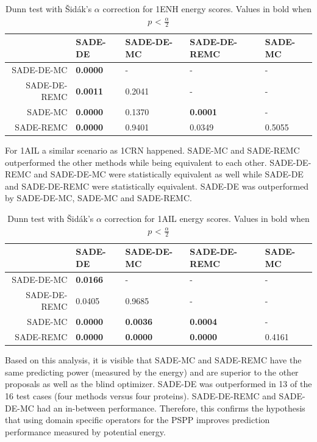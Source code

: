 \begin{table}[ht!]
  \centering
  \begin{tabular}{ r | l | l | l | l } \cline{2-5}
                 & SADE-DE         & SADE-DE-MC & SADE-DE-REMC    & SADE-MC \\ \hline \hline
   SADE-DE-MC    & \textbf{0.0000} & -          & -               & -       \\ \hline
 SADE-DE-REMC    & \textbf{0.0011} & 0.2041     & -               & -       \\ \hline
      SADE-MC    & \textbf{0.0000} & 0.1370     & \textbf{0.0001} & -       \\ \hline
    SADE-REMC    & \textbf{0.0000} & 0.9401     & 0.0349          & 0.5055  \\ \hline \hline
  \end{tabular}
  \caption{Dunn test with \v{S}idák's $\alpha$ correction for 1ENH energy scores. Values in bold when $p$ < $\frac{\alpha}{2}$}
  \label{tab:1enh-dunn-energy}
\end{table}

For 1AIL a similar scenario as 1CRN happened. SADE-MC and SADE-REMC outperformed the other methods
while being equivalent to each other. SADE-DE-REMC and SADE-DE-MC were statistically equivalent
as well while SADE-DE and SADE-DE-REMC were statistically equivalent. SADE-DE was outperformed by
SADE-DE-MC, SADE-MC and SADE-REMC.


\begin{table}[ht!]
  \centering
  \begin{tabular}{ r | l | l | l | l } \cline{2-5} 
              & SADE-DE & SADE-DE-MC & SADE-DE-REMC & SADE-MC \\ \hline \hline
   SADE-DE-MC & \textbf{0.0166} & -               & -               & -       \\ \hline
 SADE-DE-REMC & 0.0405          & 0.9685          & -               & -       \\ \hline
      SADE-MC & \textbf{0.0000} & \textbf{0.0036} & \textbf{0.0004} & -       \\ \hline
    SADE-REMC & \textbf{0.0000} & \textbf{0.0000} & \textbf{0.0000} & 0.4161  \\ \hline \hline
  \end{tabular}
  \caption{Dunn test with \v{S}idák's $\alpha$ correction for 1AIL energy scores. Values in bold when $p$ < $\frac{\alpha}{2}$}
  \label{tab:1ail-dunn-energy}
\end{table}

Based on this analysis, it is visible that SADE-MC and SADE-REMC have the same predicting
power (measured by the energy) and are superior to the other proposals as well as the blind
optimizer. SADE-DE was outperformed in 13 of the 16 test cases (four methods versus four proteins).
SADE-DE-REMC and SADE-DE-MC had an in-between performance. Therefore, this confirms 
the hypothesis that using domain specific operators for the PSPP improves
prediction performance measured by potential energy.


